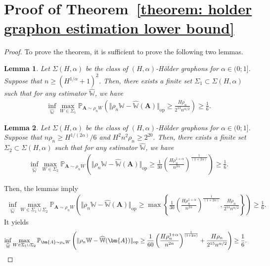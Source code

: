 \documentclass[11pt]{article}
\newcommand{\op}{\mathrm{op}}
\newcommand{\bA}{\bm{A}}
\newcommand{\bbW}{\mathbb{W}}
\newcommand{\bbP}{\mathbb{P}}
\newcommand{\<}{\langle}
\renewcommand{\>}{\rangle}
\theoremstyle{plain}
\newtheorem{lemma}{Lemma}
\theoremstyle{definition}
\theoremstyle{remark}
\begin{document}
{\section{Proof of Theorem~\ref{theorem: holder graphon estimation lower bound}}
\label{appendix: proof of holder graphon estimation lower bound}

\begin{proof}
    To prove the theorem, it is sufficient to prove the following two lemmas.
    \begin{lemma}
    \label{lemma: holder graphon estimation lower bound 1}
        Let $\Sigma(H, \alpha)$ be the class of $(H, \alpha)$-H\"older graphons for $\alpha \in (0; 1]$. Suppose that $n \ge (H^{1/\alpha} + 1)^2$. Then, there exists a finite set $\Sigma_1 \subset \Sigma(H, \alpha)$ such that for any estimator $\widehat{\bbW}$, we have 
        \begin{align*}           
            \inf_{\widehat{\bbW}} \max_{W \in \Sigma_1} \bbP_{\bA \sim \rho_n W} \left (   \Vert \rho_n \bbW -  \widehat{\bbW}(\bA) \Vert_{\op} \ge \frac{ H \rho_n}{2^{13} n^{\alpha/2}} \right ) \ge \frac{1}{6}.
        \end{align*}
    \end{lemma}

    \begin{lemma}
    \label{lemma: holder graphon estimation lower bound 2}
        Let $\Sigma(H, \alpha)$ be the class of $(H, \alpha)$-H\"older graphons for $\alpha \in (0; 1]$. Suppose that $n \rho_n \ge H^{1/(2 \alpha)} / 6$ and $H^2 n^2 \rho_n \ge 2^{20}$.  Then, there exists a finite set $\Sigma_2 \subset \Sigma(H, \alpha)$ such that for any estimator $\widehat{\bbW}$, we have
        \begin{align*}
            \inf_{\widehat{\bbW}} \max_{W \in \Sigma_2} \bbP_{\bA \sim \rho_n W} \left ( \Vert \rho_n \bbW - \widehat{ \bbW     }(\bA) \Vert_{\op} \ge \frac{1}{30} \left ( \frac{H \rho_n^{1 + \alpha}}{n^{2 \alpha}} \right )^{\frac{1}{(1 + 2 \alpha)}} \right ) \ge \frac{1}{6}.
        \end{align*}
    \end{lemma}
    Then, the lemmas imply
    \begin{align*}
       \inf_{\widehat{\bbW}} \max_{W \in \Sigma_1 \cup \Sigma_2} \bbP_{\bA \sim \rho_n W} \left ( \Vert \rho_n \bbW - \widehat{ \bbW     }(\bA) \Vert_{\op} \ge \max \left \{  \frac{1}{30} \left ( \frac{H \rho_n^{1 + \alpha}}{n^{2 \alpha}}\right )^{\frac{1}{(1 + 2 \alpha)}}, \frac{ H \rho_n}{2^{14} n^{\alpha/2}} \right \}  \right ) \ge \frac{1}{6}.
    \end{align*}
    It yields
    \begin{align*}
       \inf_{\widehat{\bbW}} \max_{W \in \Sigma_1 \cup \Sigma_2} \bbP_{\bA \sim \rho_n W} \left ( \Vert \rho_n \bbW - \widehat{ \bbW     }(\bA) \Vert_{\op} \ge \frac{1}{60} \left ( \frac{H \rho_n^{1 + \alpha}}{n^{2 \alpha}}\right )^{\frac{1}{(1 + 2 \alpha)}} + \frac{ H \rho_n}{2^{15} n^{\alpha/2}}   \right ) \ge \frac{1}{6}. & \qedhere
    \end{align*}
\end{proof}

}
\end{document}
